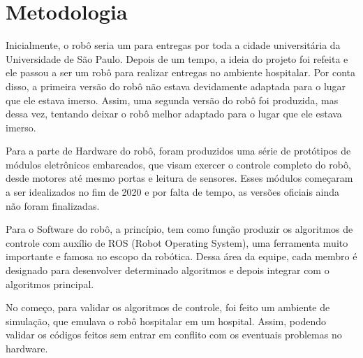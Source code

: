 \documentclass[../delivery_hospital_report.tex]{subfiles}
\begin{document}
\chapter{Metodologia}

Inicialmente, o robô seria um para entregas por toda a cidade universitária da Universidade de São Paulo. Depois de um tempo, a ideia do projeto foi refeita e ele passou a ser um robô para realizar entregas no ambiente hospitalar. Por conta disso, a primeira versão do robô não estava devidamente adaptada para o lugar que ele estava imerso. Assim, uma segunda versão do robô foi produzida, mas dessa vez, tentando deixar o robô melhor adaptado para o lugar que ele estava imerso. 

Para a parte de Hardware do robô, foram produzidos uma série de protótipos de módulos eletrônicos embarcados, que visam exercer o controle completo do robô, desde motores até mesmo portas e leitura de sensores. Esses módulos começaram a ser idealizados no fim de 2020 e por falta de tempo, as versões oficiais ainda não foram finalizadas.

Para o Software do robô, a princípio, tem como função produzir os algoritmos de controle com auxílio de ROS (Robot Operating System), uma ferramenta muito importante e famosa no escopo da robótica. Dessa área da equipe, cada membro é designado para desenvolver determinado algoritmos e depois integrar com o algoritmos principal.

No começo, para validar os algoritmos de controle, foi feito um ambiente de simulação, que emulava o robô hospitalar em um hospital. Assim, podendo validar os códigos feitos sem entrar em conflito com os eventuais problemas no hardware.
\end{document}
